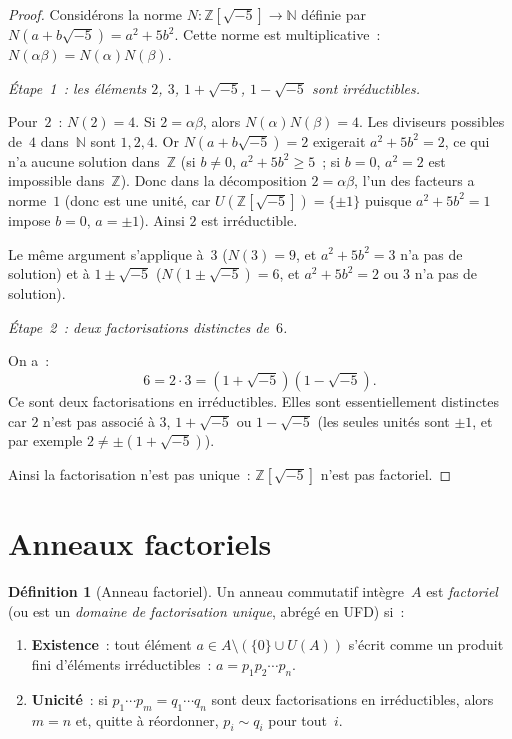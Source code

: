\documentclass[12pt,a4paper,openany]{book}
\theoremstyle{definition}
\newtheorem{definition}{Définition}[chapter]
\newcommand{\N}{\mathbb{N}}
\newcommand{\Z}{\mathbb{Z}}
\begin{document}
\begin{proof}
Considérons la norme $N \colon \Z[\sqrt{-5}] \to \N$ définie par
$N(a + b\sqrt{-5}) = a^2 + 5b^2$. Cette norme est multiplicative~:
$N(\alpha\beta) = N(\alpha)N(\beta)$.

\emph{\'Etape~1~: les éléments $2$, $3$, $1 + \sqrt{-5}$,
$1 - \sqrt{-5}$ sont irréductibles.}

Pour~$2$~: $N(2) = 4$. Si $2 = \alpha\beta$, alors
$N(\alpha)N(\beta) = 4$. Les diviseurs possibles de~$4$ dans~$\N$
sont $1, 2, 4$. Or $N(a + b\sqrt{-5}) = 2$ exigerait $a^2 + 5b^2 = 2$,
ce qui n'a aucune solution dans~$\Z$ (si $b \neq 0$, $a^2 + 5b^2
\geqslant 5$~; si $b = 0$, $a^2 = 2$ est impossible dans~$\Z$). Donc
dans la décomposition $2 = \alpha\beta$, l'un des facteurs a norme~$1$
(donc est une unité, car $U(\Z[\sqrt{-5}]) = \{\pm 1\}$ puisque
$a^2 + 5b^2 = 1$ impose $b = 0$, $a = \pm 1$). Ainsi $2$ est
irréductible.

Le même argument s'applique à~$3$ ($N(3) = 9$, et $a^2 + 5b^2 = 3$ n'a
pas de solution) et à $1 \pm \sqrt{-5}$ ($N(1 \pm \sqrt{-5}) = 6$, et
$a^2 + 5b^2 = 2$ ou $3$ n'a pas de solution).

\emph{\'Etape~2~: deux factorisations distinctes de~$6$.}

On a~:
\[
  6 = 2 \cdot 3 = (1 + \sqrt{-5})(1 - \sqrt{-5}).
\]
Ce sont deux factorisations en irréductibles. Elles sont essentiellement
distinctes car $2$ n'est pas associé à $3$, $1 + \sqrt{-5}$ ou
$1 - \sqrt{-5}$ (les seules unités sont $\pm 1$, et par exemple
$2 \neq \pm(1 + \sqrt{-5})$).

Ainsi la factorisation n'est pas unique~: $\Z[\sqrt{-5}]$ n'est pas
factoriel.
\end{proof}

\section{Anneaux factoriels}\label{sec:anneaux-factoriels}

\begin{definition}[Anneau factoriel]\label{def:anneau-factoriel}
Un anneau commutatif intègre~$A$ est \emph{factoriel} (ou est un
\emph{domaine de factorisation unique}, abrégé en UFD) si~:
\begin{enumerate}[label=\textup{(F\arabic*)}]
  \item\label{ax:F1} \textbf{Existence}~: tout élément
        $a \in A \setminus (\{0\} \cup U(A))$ s'écrit comme un produit
        fini d'éléments irréductibles~: $a = p_1 p_2 \cdots p_n$.
  \item\label{ax:F2} \textbf{Unicité}~: si $p_1 \cdots p_m
        = q_1 \cdots q_n$ sont deux factorisations en irréductibles,
        alors $m = n$ et, quitte à réordonner, $p_i \sim q_i$ pour tout~$i$.
\end{enumerate}
\end{definition}
\end{document}
